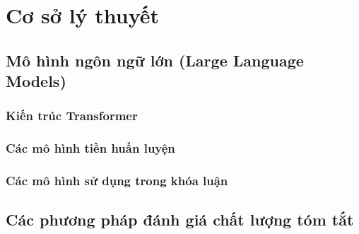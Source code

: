 \chapter{Cơ sở lý thuyết}

\section{Mô hình ngôn ngữ lớn (Large Language Models)}

\subsection{Kiến trúc Transformer}

\subsection{Các mô hình tiền huấn luyện}

\subsection{Các mô hình sử dụng trong khóa luận}
%
%
%

\section{Các phương pháp đánh giá chất lượng tóm tắt}

